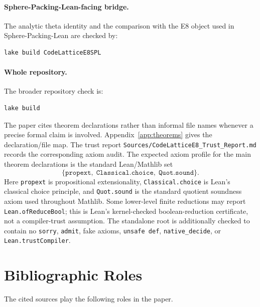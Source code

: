 \documentclass[12pt]{article}
\theoremstyle{definition}
\newcommand{\lean}[1]{\texttt{#1}}
\begin{document}
\paragraph{Sphere-Packing-Lean-facing bridge.}
The analytic theta identity and the comparison with the E8 object used in
Sphere-Packing-Lean are checked by:
\begin{lstlisting}[style=shell]
lake build CodeLatticeE8SPL
\end{lstlisting}

\paragraph{Whole repository.}
The broader repository check is:
\begin{lstlisting}[style=shell]
lake build
\end{lstlisting}

The paper cites theorem declarations rather than informal file names whenever a
precise formal claim is involved.  Appendix~\ref{app:theorems} gives the
declaration/file map.  The trust report
\lean{Sources/CodeLatticeE8\_Trust\_Report.md} records the corresponding axiom
audit.  The expected axiom profile for the main theorem declarations is the
standard Lean/Mathlib set
\[
  \{\texttt{propext},\; \texttt{Classical.choice},\; \texttt{Quot.sound}\}.
\]
Here \texttt{propext} is propositional extensionality, \texttt{Classical.choice}
is Lean's classical choice principle, and \texttt{Quot.sound} is the standard
quotient soundness axiom used throughout Mathlib.
Some lower-level finite reductions may report \lean{Lean.ofReduceBool}; this is
Lean's kernel-checked boolean-reduction certificate, not a compiler-trust
assumption.  The standalone root is additionally checked to contain no
\lean{sorry}, \lean{admit}, fake axioms, \lean{unsafe def},
\lean{native\_decide}, or \lean{Lean.trustCompiler}.

\section{Bibliographic Roles}
\label{app:bibcheck}

The cited sources play the following roles in the paper.
\end{document}
